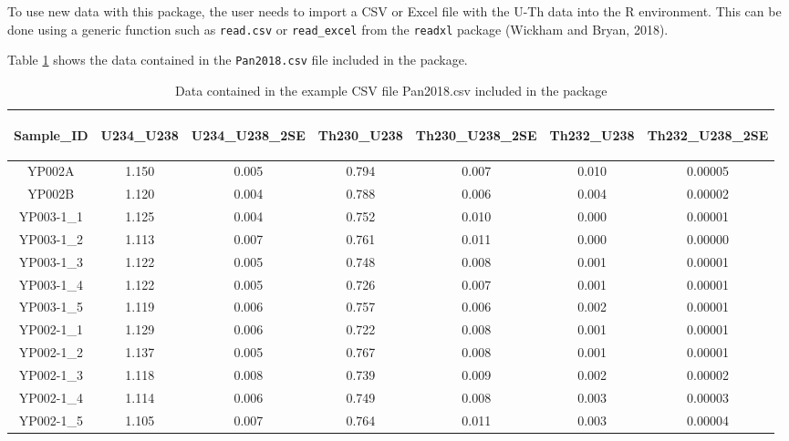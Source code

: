 \documentclass[]{elsarticle} %
\begin{document}
To use new data with this package, the user needs to import a CSV or Excel file with the U-Th data into the R environment. This can be done using a generic function such as \texttt{read.csv} or \texttt{read\_excel} from the \texttt{readxl} package (Wickham and Bryan, 2018).

Table \ref{tab:pan} shows the data contained in the \texttt{Pan2018.csv} file included in the package.

\begin{table}[ht]
\centering
\begin{tabular}{ccccccc}
  \hline
\begin{sideways} Sample\_ID \end{sideways} & \begin{sideways} U234\_U238 \end{sideways} & \begin{sideways} U234\_U238\_2SE \end{sideways} & \begin{sideways} Th230\_U238 \end{sideways} & \begin{sideways} Th230\_U238\_2SE \end{sideways} & \begin{sideways} Th232\_U238 \end{sideways} & \begin{sideways} Th232\_U238\_2SE \end{sideways} \\ 
  \hline
YP002A & 1.150 & 0.005 & 0.794 & 0.007 & 0.010 & 0.00005 \\ 
  YP002B & 1.120 & 0.004 & 0.788 & 0.006 & 0.004 & 0.00002 \\ 
  YP003-1\_1 & 1.125 & 0.004 & 0.752 & 0.010 & 0.000 & 0.00001 \\ 
  YP003-1\_2 & 1.113 & 0.007 & 0.761 & 0.011 & 0.000 & 0.00000 \\ 
  YP003-1\_3 & 1.122 & 0.005 & 0.748 & 0.008 & 0.001 & 0.00001 \\ 
  YP003-1\_4 & 1.122 & 0.005 & 0.726 & 0.007 & 0.001 & 0.00001 \\ 
  YP003-1\_5 & 1.119 & 0.006 & 0.757 & 0.006 & 0.002 & 0.00001 \\ 
  YP002-1\_1 & 1.129 & 0.006 & 0.722 & 0.008 & 0.001 & 0.00001 \\ 
  YP002-1\_2 & 1.137 & 0.005 & 0.767 & 0.008 & 0.001 & 0.00001 \\ 
  YP002-1\_3 & 1.118 & 0.008 & 0.739 & 0.009 & 0.002 & 0.00002 \\ 
  YP002-1\_4 & 1.114 & 0.006 & 0.749 & 0.008 & 0.003 & 0.00003 \\ 
  YP002-1\_5 & 1.105 & 0.007 & 0.764 & 0.011 & 0.003 & 0.00004 \\ 
   \hline
\end{tabular}
\caption{\label{tab:pan}Data contained in the example CSV file Pan2018.csv included in the package} 
\end{table}
\end{document}
